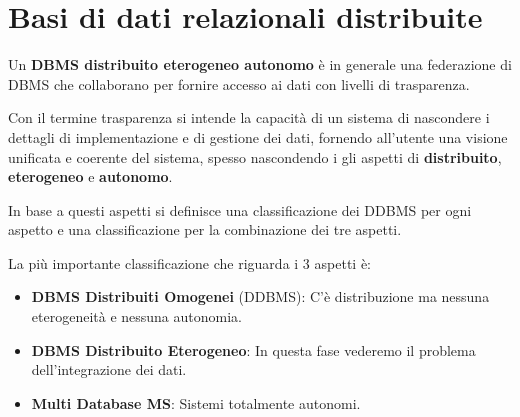 \chapter{Basi di dati relazionali distribuite}
\begin{definizione}
      Un \textbf{DBMS distribuito eterogeneo autonomo} è in generale una
      federazione di DBMS che collaborano per fornire accesso ai dati con livelli
      di trasparenza.
\end{definizione}
Con il termine trasparenza si intende la capacità di un sistema di
nascondere i dettagli di implementazione e di gestione dei dati, fornendo
all'utente una visione unificata e coerente del sistema, spesso nascondendo i gli
aspetti di \textbf{distribuito}, \textbf{eterogeneo} e \textbf{autonomo}.

In base a questi aspetti si definisce una classificazione dei DDBMS per ogni aspetto
e una classificazione per la combinazione dei tre aspetti.

La più importante classificazione che riguarda i $3$ aspetti è:
\begin{itemize}
      \item \textbf{DBMS Distribuiti Omogenei} (DDBMS): C'è distribuzione ma
            nessuna eterogeneità e nessuna autonomia.
      \item \textbf{DBMS Distribuito Eterogeneo}: In questa fase vederemo il
            problema dell'integrazione dei dati.
      \item \textbf{Multi Database MS}: Sistemi totalmente autonomi.
\end{itemize}
